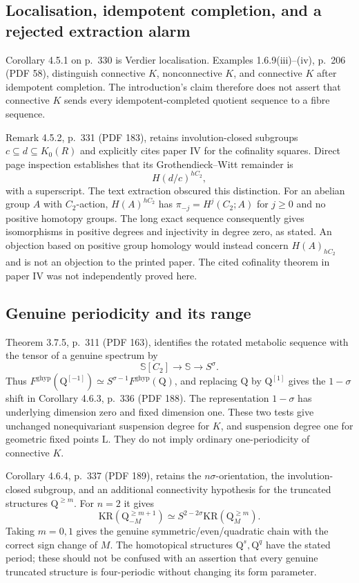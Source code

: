 \documentclass[10pt]{article}
\begin{document}
\subsection*{Localisation, idempotent completion, and a rejected extraction alarm}
Corollary 4.5.1 on p. 330 is Verdier localisation. Examples 1.6.9(iii)–(iv), p. 206 (PDF 58), distinguish connective \(K\), nonconnective \(K\), and connective \(K\) after idempotent completion. The introduction’s claim therefore does not assert that connective \(K\) sends every idempotent-completed quotient sequence to a fibre sequence.\par
Remark 4.5.2, p. 331 (PDF 183), retains involution-closed subgroups \(c\subseteq d\subseteq K_0(R)\) and explicitly cites paper IV for the cofinality squares. Direct page inspection establishes that its Grothendieck–Witt remainder is \[H(d/c)^{hC_2},\] with a superscript. The text extraction obscured this distinction. For an abelian group \(A\) with \(C_2\)-action, \(H(A)^{hC_2}\) has \(\pi_{-j}=H^j(C_2;A)\) for \(j\geq0\) and no positive homotopy groups. The long exact sequence consequently gives isomorphisms in positive degrees and injectivity in degree zero, as stated. An objection based on positive group homology would instead concern \(H(A)_{hC_2}\) and is not an objection to the printed paper. The cited cofinality theorem in paper IV was not independently proved here.\par
\subsection*{Genuine periodicity and its range}
Theorem 3.7.5, p. 311 (PDF 163), identifies the rotated metabolic sequence with the tensor of a genuine spectrum by \[\mathbb S[C_2]\longrightarrow\mathbb S\longrightarrow S^\sigma.\] Thus \(F^{\mathrm{ghyp}}(\mathord{\mathrm{Q}}^{[-1]})\simeq
S^{\sigma-1}F^{\mathrm{ghyp}}(\mathord{\mathrm{Q}})\), and replacing \(\mathord{\mathrm{Q}}\) by \(\mathord{\mathrm{Q}}^{[1]}\) gives the \(1-\sigma\) shift in Corollary 4.6.3, p. 336 (PDF 188). The representation \(1-\sigma\) has underlying dimension zero and fixed dimension one. These two tests give unchanged nonequivariant suspension degree for \(K\), and suspension degree one for geometric fixed points \(\mathrm{L}\). They do not imply ordinary one-periodicity of connective \(K\).\par
Corollary 4.6.4, p. 337 (PDF 189), retains the \(n\sigma\)-orientation, the involution-closed subgroup, and an additional connectivity hypothesis for the truncated structures \(\mathord{\mathrm{Q}}^{\geq m}\). For \(n=2\) it gives \[\mathrm{KR}(\mathord{\mathrm{Q}}_{-M}^{\geq m+1})\simeq
 S^{2-2\sigma}\mathrm{KR}(\mathord{\mathrm{Q}}_M^{\geq m}).\] Taking \(m=0,1\) gives the genuine symmetric/even/quadratic chain with the correct sign change of \(M\). The homotopical structures \(\mathord{\mathrm{Q}}^s,\mathord{\mathrm{Q}}^q\) have the stated period; these should not be confused with an assertion that every genuine truncated structure is four-periodic without changing its form parameter.\par
\end{document}
